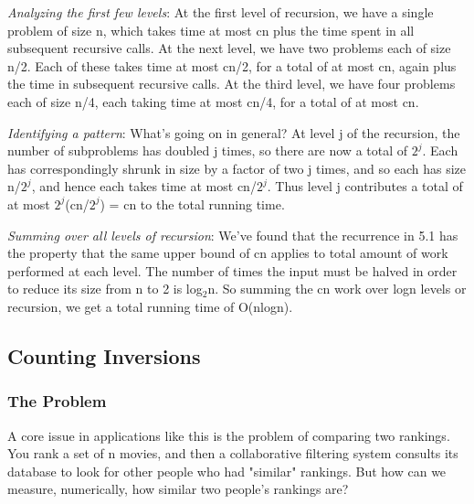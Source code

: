 \documentclass{article}
\begin{document}
\medskip

\emph{Analyzing the first few levels}: At the first level of recursion, we have a single problem of size n, which takes time at most cn plus the time spent in all subsequent recursive calls. At the next level, we have two problems each of size n/2. Each of these takes time at most cn/2, for a total of at most cn, again plus the time in subsequent recursive calls. At the third level, we have four problems each of size n/4, each taking time at most cn/4, for a total of at most cn.

\medskip


\emph{Identifying a pattern}: What's going on in general? At level j of the recursion, the number of subproblems has doubled j times, so there are now a total of $2^j$. Each has correspondingly shrunk in size by a factor of two j times, and so each has size n/$2^j$, and hence each takes time at most cn/$2^j$. Thus level j contributes a total of at most $2^j$(cn/$2^j$) = cn to the total running time.

\medskip

\emph{Summing over all levels of recursion}: We've found that the recurrence in 5.1 has the property that the same upper bound of cn applies to total amount of work performed at each level. The number of times the input must be halved in order to reduce its size from n to 2 is log$_2$n. So summing the cn work over logn levels or recursion, we get a total running time of O(nlogn).

\medskip

\begin{center}
\end{center}

\subsection{Counting Inversions}
\subsubsection{The Problem}
A core issue in applications like this is the problem of comparing two rankings. You rank a set of n movies, and then a collaborative filtering system consults its database to look for other people who had "similar" rankings. But how can we measure, numerically, how similar two people's rankings are?

\medskip
\end{document}
